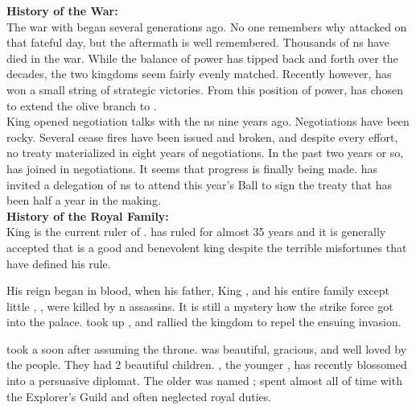 \documentclass[blue]{NeptuneBall}
\begin{document}
\name{\bAtlantian{}}



{\bf History of the War:}\\
The war with \pPacifica{} began several generations ago. No one remembers why \pPacifica{} attacked on that fateful day, but the aftermath is well remembered. Thousands of \pAtlantis{}ns have died in the war. While the balance of power has tipped back and forth over the decades, the two kingdoms seem fairly evenly matched. Recently however, \pAtlantis{} has won a small string of strategic victories. From this position of power, \cKing{\King} \cKing{} has chosen to extend the olive branch to \pPacifica{}.\\

King \cKing{\MYname{}} opened negotiation talks with the \pPacifica{}ns nine years ago. Negotiations have been rocky. Several cease fires have been issued and broken, and despite every effort, no treaty materialized in eight years of negotiations. In the past two years or so, \cPrincess{\Prince} \cPrincess{} has joined \cPrincess{\their} \cKing{\parent} in negotiations. It seems that progress is finally being made. \cKing{\King} \cKing{} has  invited a delegation of \pPacifica{}ns to attend this year's \cExExKing{} Ball to sign the treaty that has been half a year in the making.\\

{\bf History of the Royal Family:}\\
King \cKing{\MYname{}} is the current ruler of \pAtlantis{}. \cKing{\They} has ruled for almost 35 years and it is generally accepted that \cKing{\they} is a good and benevolent king despite the terrible misfortunes that have defined his rule.

His reign began in blood, when his father, King \cExKing{}, and his entire family except \cKing{\their} little \cPlant{\sibling}, \cPlant{}, were killed by \pPacifica{}n assassins. It is still a mystery how the strike force got into the palace. \cKing{} took up \iTrident{\MYname{}}, and rallied the kingdom to repel the ensuing invasion.

\cKing{\King} \cKing{} took a \cQueen{\spouse} soon after assuming the throne. \cQueen{\King} \cQueen{} was beautiful, gracious, and well loved by the people. They had 2 beautiful children. \cPrincess{\Prince} \cPrincess{}, the younger \cPrincess{\offspring}, has recently blossomed into a persuasive diplomat. The older \cAriel{\Prince} was named \cAriel{}; \cAriel{} spent almost all of \cAriel{\their} time with the Explorer's Guild and often neglected \cAriel{\their} royal duties. 
\end{document}
